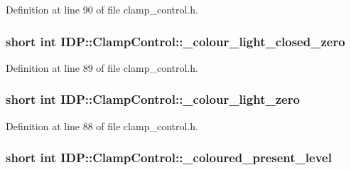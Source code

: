 Definition at line 90 of file clamp\_\-control.h.

\hypertarget{classIDP_1_1ClampControl_a7639828ac6b5d83131718412b3dd5ca2}{
\subsubsection[{\_\-colour\_\-light\_\-closed\_\-zero}]{\setlength{\rightskip}{0pt plus 5cm}short int {\bf IDP::ClampControl::\_\-colour\_\-light\_\-closed\_\-zero}}}
\label{classIDP_1_1ClampControl_a7639828ac6b5d83131718412b3dd5ca2}


Definition at line 89 of file clamp\_\-control.h.

\hypertarget{classIDP_1_1ClampControl_aa8dfb019900ee99b77e3eeb227d4de18}{
\subsubsection[{\_\-colour\_\-light\_\-zero}]{\setlength{\rightskip}{0pt plus 5cm}short int {\bf IDP::ClampControl::\_\-colour\_\-light\_\-zero}}}
\label{classIDP_1_1ClampControl_aa8dfb019900ee99b77e3eeb227d4de18}


Definition at line 88 of file clamp\_\-control.h.

\hypertarget{classIDP_1_1ClampControl_ab9e34e39d14e415e3a9b938451fe70a6}{
\subsubsection[{\_\-coloured\_\-present\_\-level}]{\setlength{\rightskip}{0pt plus 5cm}short int {\bf IDP::ClampControl::\_\-coloured\_\-present\_\-level}}}
\label{classIDP_1_1ClampControl_ab9e34e39d14e415e3a9b938451fe70a6}


